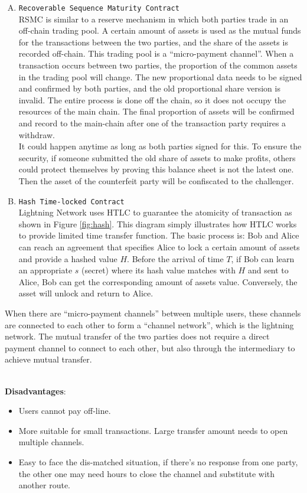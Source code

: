 \begin{enumerate}[A.]
    \item \texttt{Recoverable Sequence Maturity Contract} \\
    RSMC is similar to a reserve mechanism in which both parties trade in an off-chain trading pool. A certain amount of assets is used as the mutual funds for the transactions between the two parties, and the share of the assets is recorded off-chain. This trading pool is a ``micro-payment channel''. When a transaction occurs between two parties, the proportion of the common assets in the trading pool will change. The new proportional data needs to be signed and confirmed by both parties, and the old proportional share version is invalid. The entire process is done off the chain, so it does not occupy the resources of the main chain. The final proportion of assets will be confirmed and record to the main-chain after one of the transaction party requires a withdraw.\\
    It could happen anytime as long as both parties signed for this. To ensure the security, if someone submitted the old share of assets to make profits, others could protect themselves by proving this balance sheet is not the latest one. Then the asset of the counterfeit party will be confiscated to the challenger.
    \item \texttt{Hash Time-locked Contract}\\
     Lightning Network uses HTLC to guarantee the atomicity of transaction as shown in Figure \ref{fig:hash}. This diagram simply illustrates how HTLC works to provide limited time transfer function. The basic process is: Bob and Alice can reach an agreement that specifies Alice to lock a certain amount of assets and provide a hashed value $H$. Before the arrival of time $T$, if Bob can learn an appropriate $s$ (secret) where its hash value matches with $H$ and sent to Alice, Bob can get the corresponding amount of assets value. Conversely, the asset will unlock and return to Alice.
\end{enumerate}
\noindent When there are ``micro-payment channels'' between multiple users, these channels are connected to each other to form a ``channel network'', which is the lightning network. The mutual transfer of the two parties does not require a direct payment channel to connect to each other, but also through the intermediary to achieve mutual transfer. \\ \\
\noindent \begin{large}
\textbf{Disadvantages}:
\end{large}
\begin{itemize}
    \item Users cannot pay off-line. 
    \item More suitable for small transactions. Large transfer amount needs to open multiple channels.
    \item Easy to face the dis-matched situation, if there's no response from one party, the other one may need hours to close the channel and substitute with another route.
\end{itemize}


